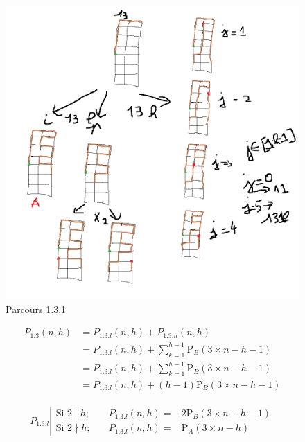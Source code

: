 \documentclass[twoside, a4paper, 12pt]{report}
\newcommand{\pa}[2]{\ensuremath{\text{P}_A\left(#1 \times #2\right)}}
\newcommand{\pb}[2]{\ensuremath{\text{P}_B\left(#1 \times #2\right)}}
\begin{document}
\begin{figure}[h]
\centering\includegraphics[angle=0, scale=0.4]{131.png}
\caption{Parcours 1.3.1}
\label{pc131}
\end{figure}

\begin{align}
P_{1.3}(n, h) &= P_{1.3.l}(n, h) + P_{1.3.h}(n, h)\\
&= P_{1.3.l}(n, h) + \sum_{k=1}^{h-1} \pb{3}{n-h-1}\\
&= P_{1.3.l}(n, h) + \sum_{k=1}^{h-1} \pb{3}{n-h-1}\\
&= P_{1.3.l}(n, h) + (h-1) \pb{3}{n-h-1}\\
\end{align}

\[
P_{1.3.l}
\left|
  \begin{array}{rcl}
    \text{Si } 2\mid h; & \quad P_{1.3.l}(n, h) =& 2 \pb{3}{n-h-1}\\
    \text{Si } 2\nmid h; & \quad P_{1.3.l}(n, h) =& \pa{3}{n-h}
  \end{array}
\right.
\]
\end{document}
